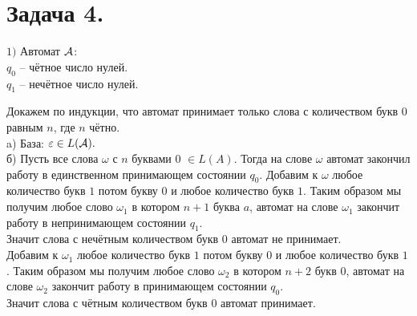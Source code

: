 \documentclass[12pt]{article}
\theoremstyle{definition}
\theoremstyle{definition}
\let\eps\varepsilon
\let\om\omega
\def\A{{\cal A}}
\begin{document}
\section*{Задача 4.}
$1)$ Автомат $\A$: \\
$q_0$ -- чётное число нулей. \\
$q_1$ -- нечётное число нулей.
\begin{center}
\end{center}

Докажем по индукции, что автомат принимает только слова с количеством букв $0$  равным $n$, где $n$ чётно.\\
a) База: $\eps \in L(\A).$\\
б) Пусть все слова $\om$ с $n$ буквами $0$ $\in L(A)$. Тогда на слове $\om$ автомат закончил работу в единственном принимающем состоянии $q_0$. Добавим к $\omega$ любое количество букв $1$ потом букву $0$ и любое количество букв $1$. Таким образом мы получим любое слово $\om_1$ в котором $n+1$ буква $a$, автомат на слове $\om_1$ закончит работу в непринимающем состоянии $q_1$.  \\
Значит слова с нечётным количеством букв $0$ автомат не принимает.\\
Добавим к $\om_1$ любое количество букв $1$ потом букву $0$ и любое количество букв $1$. Таким образом мы получим любое слово $\om_2$ в котором $n+2$ букв $0$, автомат на слове $\om_2$ закончит работу в принимающем состоянии $q_0$.  \\ 
Значит слова с чётным количеством букв $0$ автомат принимает.\\
\end{document}
